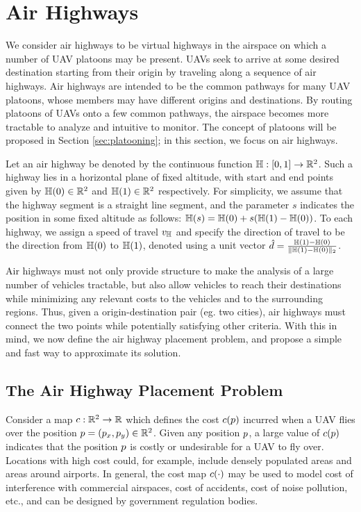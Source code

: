 \section{Air Highways}
We consider air highways to be virtual highways in the airspace on which a number of UAV platoons may be present. UAVs seek to arrive at some desired destination starting from their origin by traveling along a sequence of air highways. Air highways are intended to be the common pathways for many UAV platoons, whose members may have different origins and destinations. By routing platoons of UAVs onto a few common pathways, the airspace becomes more tractable to analyze and intuitive to monitor. The concept of platoons will be proposed in Section \ref{sec:platooning}; in this section, we focus on air highways.

Let an air highway be denoted by the continuous function $\mathbb{H}: [0, 1] \rightarrow \mathbb{R}^2$. Such a highway lies in a horizontal plane of fixed altitude, with start and end points given by $\mathbb{H}(0)\in\mathbb{R}^2$ and $\mathbb{H}(1)\in\mathbb{R}^2$ respectively. For simplicity, we assume that the highway segment is a straight line segment, and the parameter $s$ indicates the position in some fixed altitude as follows: $\mathbb{H}(s) = \mathbb{H}(0) + s(\mathbb{H}(1) - \mathbb{H}(0))$. To each highway, we assign a speed of travel $v_{\mathbb{H}}$ and specify the direction of travel to be the direction from $\mathbb{H}(0)$ to $\mathbb{H}(1)$, denoted using a unit vector $\hat{d} = \frac{\mathbb{H}(1) - \mathbb{H}(0)}{\lVert\mathbb{H}(1) - \mathbb{H}(0)\rVert_2}$.

Air highways must not only provide structure to make the analysis of a large number of vehicles tractable, but also allow vehicles to reach their destinations while minimizing any relevant costs to the vehicles and to the surrounding regions. Thus, given a origin-destination pair (eg. two cities), air highways must connect the two points while potentially satisfying other criteria. With this in mind, we now define the air highway placement problem, and propose a simple and fast way to approximate its solution.

\subsection{The Air Highway Placement Problem}
Consider a map $c:\mathbb{R}^2 \rightarrow \mathbb{R}$ which defines the cost $c(p)$ incurred when a UAV flies over the position $p=(p_x,p_y)\in\mathbb{R}^2$. Given any position $p$, a large value of $c(p)$ indicates that the position $p$ is costly or undesirable for a UAV to fly over. Locations with high cost could, for example, include densely populated areas and areas around airports. In general, the cost map $c(\cdot)$ may be used to model cost of interference with commercial airspaces, cost of accidents, cost of noise pollution, etc., and can be designed by government regulation bodies.

